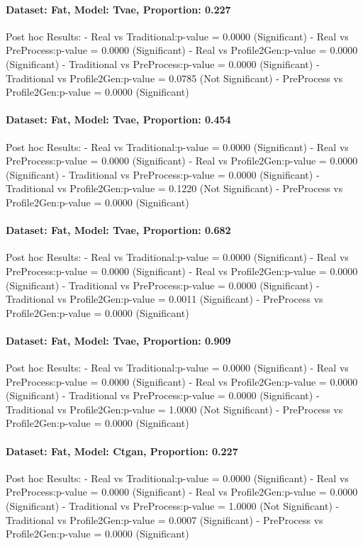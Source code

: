 \documentclass{article}
\theoremstyle{plain}
\theoremstyle{definition}
\theoremstyle{remark}
\begin{document}
\paragraph{Dataset: Fat, Model: Tvae, Proportion: 0.227
}Post hoc Results:
- Real vs Traditional:p-value = 0.0000 (Significant)
- Real vs PreProcess:p-value = 0.0000 (Significant)
- Real vs Profile2Gen:p-value = 0.0000 (Significant)
- Traditional vs PreProcess:p-value = 0.0000 (Significant)
- Traditional vs Profile2Gen:p-value = 0.0785 (Not Significant)
- PreProcess vs Profile2Gen:p-value = 0.0000 (Significant)

\paragraph{Dataset: Fat, Model: Tvae, Proportion: 0.454
}Post hoc Results:
- Real vs Traditional:p-value = 0.0000 (Significant)
- Real vs PreProcess:p-value = 0.0000 (Significant)
- Real vs Profile2Gen:p-value = 0.0000 (Significant)
- Traditional vs PreProcess:p-value = 0.0000 (Significant)
- Traditional vs Profile2Gen:p-value = 0.1220 (Not Significant)
- PreProcess vs Profile2Gen:p-value = 0.0000 (Significant)

\paragraph{Dataset: Fat, Model: Tvae, Proportion: 0.682
}Post hoc Results:
- Real vs Traditional:p-value = 0.0000 (Significant)
- Real vs PreProcess:p-value = 0.0000 (Significant)
- Real vs Profile2Gen:p-value = 0.0000 (Significant)
- Traditional vs PreProcess:p-value = 0.0000 (Significant)
- Traditional vs Profile2Gen:p-value = 0.0011 (Significant)
- PreProcess vs Profile2Gen:p-value = 0.0000 (Significant)

\paragraph{Dataset: Fat, Model: Tvae, Proportion: 0.909
}Post hoc Results:
- Real vs Traditional:p-value = 0.0000 (Significant)
- Real vs PreProcess:p-value = 0.0000 (Significant)
- Real vs Profile2Gen:p-value = 0.0000 (Significant)
- Traditional vs PreProcess:p-value = 0.0000 (Significant)
- Traditional vs Profile2Gen:p-value = 1.0000 (Not Significant)
- PreProcess vs Profile2Gen:p-value = 0.0000 (Significant)

\paragraph{Dataset: Fat, Model: Ctgan, Proportion: 0.227
}Post hoc Results:
- Real vs Traditional:p-value = 0.0000 (Significant)
- Real vs PreProcess:p-value = 0.0000 (Significant)
- Real vs Profile2Gen:p-value = 0.0000 (Significant)
- Traditional vs PreProcess:p-value = 1.0000 (Not Significant)
- Traditional vs Profile2Gen:p-value = 0.0007 (Significant)
- PreProcess vs Profile2Gen:p-value = 0.0000 (Significant)
\end{document}
